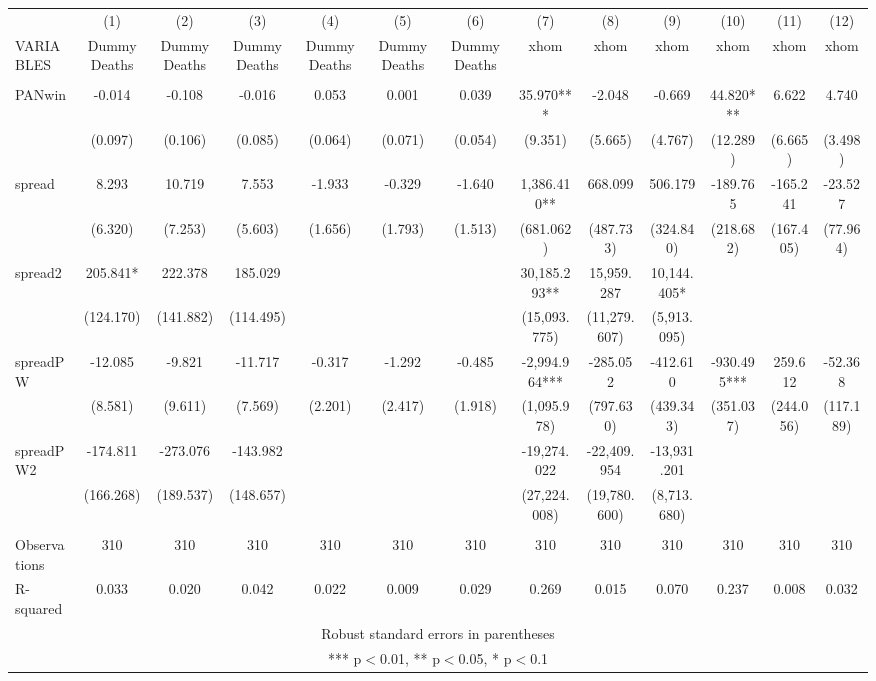 \begin{tabular}{lcccccccccccc} \hline
 & (1) & (2) & (3) & (4) & (5) & (6) & (7) & (8) & (9) & (10) & (11) & (12) \\
VARIABLES & DummyDeaths & DummyDeaths & DummyDeaths & DummyDeaths & DummyDeaths & DummyDeaths & xhom & xhom & xhom & xhom & xhom & xhom \\ \hline
 &  &  &  &  &  &  &  &  &  &  &  &  \\
PANwin & -0.014 & -0.108 & -0.016 & 0.053 & 0.001 & 0.039 & 35.970*** & -2.048 & -0.669 & 44.820*** & 6.622 & 4.740 \\
 & (0.097) & (0.106) & (0.085) & (0.064) & (0.071) & (0.054) & (9.351) & (5.665) & (4.767) & (12.289) & (6.665) & (3.498) \\
spread & 8.293 & 10.719 & 7.553 & -1.933 & -0.329 & -1.640 & 1,386.410** & 668.099 & 506.179 & -189.765 & -165.241 & -23.527 \\
 & (6.320) & (7.253) & (5.603) & (1.656) & (1.793) & (1.513) & (681.062) & (487.733) & (324.840) & (218.682) & (167.405) & (77.964) \\
spread2 & 205.841* & 222.378 & 185.029 &  &  &  & 30,185.293** & 15,959.287 & 10,144.405* &  &  &  \\
 & (124.170) & (141.882) & (114.495) &  &  &  & (15,093.775) & (11,279.607) & (5,913.095) &  &  &  \\
spreadPW & -12.085 & -9.821 & -11.717 & -0.317 & -1.292 & -0.485 & -2,994.964*** & -285.052 & -412.610 & -930.495*** & 259.612 & -52.368 \\
 & (8.581) & (9.611) & (7.569) & (2.201) & (2.417) & (1.918) & (1,095.978) & (797.630) & (439.343) & (351.037) & (244.056) & (117.189) \\
spreadPW2 & -174.811 & -273.076 & -143.982 &  &  &  & -19,274.022 & -22,409.954 & -13,931.201 &  &  &  \\
 & (166.268) & (189.537) & (148.657) &  &  &  & (27,224.008) & (19,780.600) & (8,713.680) &  &  &  \\
 &  &  &  &  &  &  &  &  &  &  &  &  \\
Observations & 310 & 310 & 310 & 310 & 310 & 310 & 310 & 310 & 310 & 310 & 310 & 310 \\
 R-squared & 0.033 & 0.020 & 0.042 & 0.022 & 0.009 & 0.029 & 0.269 & 0.015 & 0.070 & 0.237 & 0.008 & 0.032 \\ \hline
\multicolumn{13}{c}{ Robust standard errors in parentheses} \\
\multicolumn{13}{c}{ *** p$<$0.01, ** p$<$0.05, * p$<$0.1} \\
\end{tabular}
